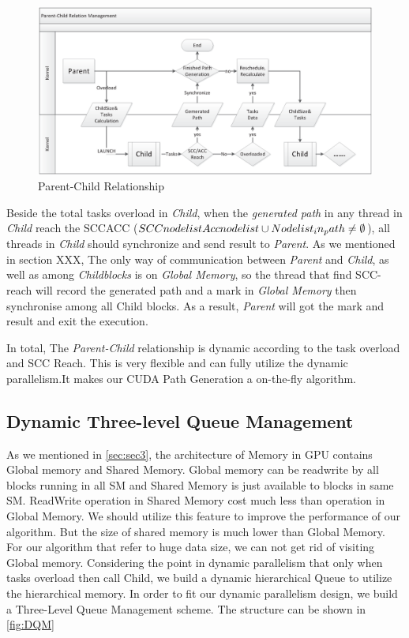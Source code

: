 \documentclass{llncs}
\begin{document}
\begin{figure}[htbp]
    \includegraphics[width=\textwidth]{PCRelation.eps}
    \caption{Parent-Child Relationship}
    \label{fig:PCRelation}
\end{figure}

Beside the total tasks overload in \textsl{Child}, when the \textsl{generated path} in any thread in \textsl{Child} reach the SCC\/ACC ($SCCnodelist\\Accnodelist \cup Nodelist_in_path \neq \emptyset$), all threads in \textsl{Child} should synchronize and send result to \textsl{Parent}. As we mentioned in section XXX, The only way of communication between \textsl{Parent} and \textsl{Child}, as well as among \textsl{Childblocks} is on \textsl{Global Memory}, so the thread that find SCC-reach will record the generated path and a mark in \textsl{Global Memory} then synchronise among all Child blocks. As a result, \textsl{Parent} will got the mark and result and exit the execution.

In total, The \textsl{Parent-Child} relationship is dynamic according to the task overload and SCC Reach. This is very flexible and can fully utilize the dynamic parallelism.It makes our CUDA Path Generation a on-the-fly algorithm.
%
\subsection{Dynamic Three-level Queue Management}
%

As we mentioned in \ref{sec:sec3}, the architecture of Memory in GPU contains Global memory and Shared Memory. Global memory can be read\/write by all blocks running in all SM and Shared Memory is just available to blocks in same SM. Read\/Write operation in Shared Memory cost much less than operation in Global Memory. We should utilize this feature to improve the performance of our algorithm. But the size of shared memory is much lower than Global Memory. For our algorithm that refer to huge data size, we can not get rid of visiting Global memory. Considering the point in dynamic parallelism that only when tasks overload then call Child, we build a dynamic hierarchical Queue to utilize the hierarchical memory. In order to fit our dynamic parallelism design, we build a Three-Level Queue Management scheme. The structure can be shown in \ref{fig:DQM}
\end{document}
